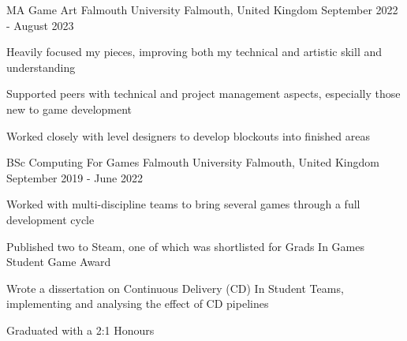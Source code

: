 \begin{cventries}
  \cventry
  {MA Game Art}
  {Falmouth University}
  {Falmouth, United Kingdom}
  {September 2022 - August 2023}
  {
    \begin{cvitems}
      \item Heavily focused my pieces, improving both my technical and artistic skill and understanding
      \item Supported peers with technical and project management aspects, especially those new to game development
      \item Worked closely with level designers to develop blockouts into finished areas
    \end{cvitems}
  }

  \cventry
    {BSc Computing For Games} %
    {Falmouth University} %
    {Falmouth, United Kingdom} %
    {September 2019 - June 2022} %
    {
      \begin{cvitems} %
        \item Worked with multi-discipline teams to bring several games through a full development cycle
        \item Published two to Steam, one of which was shortlisted for Grads In Games Student Game Award
        \item Wrote a dissertation on Continuous Delivery (CD) In Student Teams, implementing and analysing the effect of CD pipelines
        \item Graduated with a 2:1 Honours
      \end{cvitems}
    }
\end{cventries}